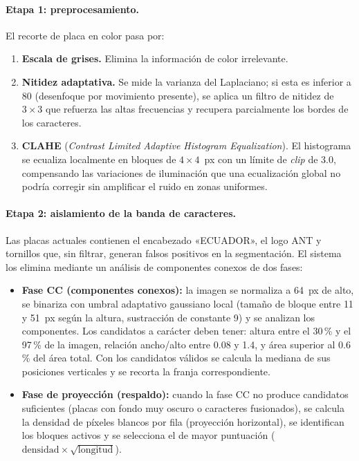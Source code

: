 \documentclass[11pt]{article}
\begin{document}
\paragraph{Etapa 1: preprocesamiento.}
El recorte de placa en color pasa por:
\begin{enumerate}
    \item \textbf{Escala de grises.} Elimina la información de color irrelevante.
    \item \textbf{Nitidez adaptativa.} Se mide la varianza del Laplaciano; si esta
    es inferior a 80 (desenfoque por movimiento presente), se aplica un filtro de
    nitidez de $3\times3$ que refuerza las altas frecuencias y recupera parcialmente
    los bordes de los caracteres.
    \item \textbf{CLAHE} (\emph{Contrast Limited Adaptive Histogram Equalization}).
    El histograma se ecualiza localmente en bloques de $4\times4$~px con un límite de
    \emph{clip} de 3.0, compensando las variaciones de iluminación que una
    ecualización global no podría corregir sin amplificar el ruido en zonas uniformes.
\end{enumerate}

\paragraph{Etapa 2: aislamiento de la banda de caracteres.}
Las placas actuales contienen el encabezado «ECUADOR», el logo ANT y tornillos que,
sin filtrar, generan falsos positivos en la segmentación. El sistema los elimina
mediante un análisis de componentes conexos de dos fases:

\begin{itemize}
    \item \textbf{Fase CC (componentes conexos):} la imagen se normaliza a 64~px de
    alto, se binariza con umbral adaptativo gaussiano local (tamaño de bloque entre
    11 y 51~px según la altura, sustracción de constante 9) y se analizan los
    componentes. Los candidatos a carácter deben tener: altura entre el 30\,\% y el
    97\,\% de la imagen, relación ancho/alto entre 0.08 y 1.4, y área superior al
    0.6\,\% del área total. Con los candidatos válidos se calcula la mediana de sus
    posiciones verticales y se recorta la franja correspondiente.
    \item \textbf{Fase de proyección (respaldo):} cuando la fase CC no produce
    candidatos suficientes (placas con fondo muy oscuro o caracteres fusionados), se
    calcula la densidad de píxeles blancos por fila (proyección horizontal), se
    identifican los bloques activos y se selecciona el de mayor puntuación
    ($\text{densidad}\times\sqrt{\text{longitud}}$).
\end{itemize}
\end{document}
